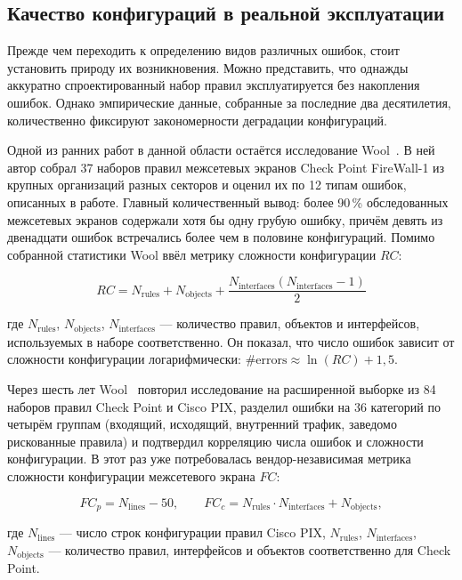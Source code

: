 \subsection{Качество конфигураций в реальной эксплуатации}
\label{sec:Section2:empirical}

Прежде чем переходить к определению видов различных ошибок, стоит установить природу их возникновения. Можно представить, что однажды аккуратно спроектированный набор правил эксплуатируется без накопления ошибок. Однако эмпирические данные, собранные за последние два десятилетия, количественно фиксируют закономерности деградации конфигураций.

Одной из ранних работ в данной области остаётся исследование Wool~\cite{wool2004quantitative}. В ней автор собрал 37 наборов правил межсетевых экранов Check Point FireWall-1 из крупных организаций разных секторов и оценил их по 12 типам ошибок, описанных в работе. Главный количественный вывод: более 90\,\% обследованных межсетевых экранов содержали хотя бы одну грубую ошибку, причём девять из двенадцати ошибок встречались более чем в половине конфигураций.
Помимо собранной статистики Wool ввёл метрику сложности конфигурации $RC$:

\begin{equation*}
    RC = N_{\text{rules}} + N_{\text{objects}} + \frac{N_{\text{interfaces}}(N_{\text{interfaces}} - 1)}{2}
\end{equation*}

где $N_{\text{rules}}$, $N_{\text{objects}}$, $N_{\text{interfaces}}$ --- количество правил, объектов и интерфейсов, используемых в наборе соответственно. Он показал, что число ошибок зависит от сложности конфигурации логарифмически: $\#\text{errors} \approx \ln(RC) + 1{,}5$.

Через шесть лет Wool~\cite{wool2010trends} повторил исследование на расширенной выборке из 84 наборов правил Check Point и Cisco PIX, разделил ошибки на 36 категорий по четырём группам (входящий, исходящий, внутренний трафик, заведомо рискованные правила) и подтвердил корреляцию числа ошибок и сложности конфигурации. В этот раз уже потребовалась вендор-независимая метрика сложности конфигурации межсетевого экрана $FC$:

\begin{equation*}
FC_p = N_{\text{lines}} - 50, \qquad FC_c = N_{\text{rules}} \cdot N_{\text{interfaces}} + N_{\text{objects}},
\end{equation*}

где $N_{\text{lines}}$ --- число строк конфигурации правил Cisco PIX, $N_{\text{rules}}$, $N_{\text{interfaces}}$, $N_{\text{objects}}$ --- количество правил, интерфейсов и объектов соответственно для Check Point.

